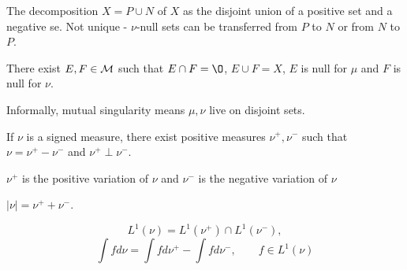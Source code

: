 \begin{dfn}
The decomposition $X = P \cup N$ of $X$ as the disjoint union of a positive set and a negative se. Not unique - $\nu$-null sets can be transferred from $P$ to $N$ or from $N$ to $P$.
\end{dfn}

\begin{dfn}
	There exist $E, F \in {\mathcal M}$ such that $E \cap F = \O $, $E \cup F = X$, $E$ is null for $\mu$ and $F$ is null for $\nu$.
\end{dfn}

\begin{rmk}
Informally, mutual singularity means $\mu, \nu$ live on disjoint sets.
\end{rmk}

\begin{thm}
	If $\nu$ is a signed measure, there exist positive measures $\nu^+, \nu^-$ such that $\nu = \nu^+ - \nu^-$ and $\nu^+ \perp \nu^-$.
\end{thm}

\begin{dfn}[$\nu^+, \nu^-$]
	$\nu^+$ is the positive variation of $\nu$ and $\nu^-$ is the negative variation of $\nu$
\end{dfn}

\begin{dfn}
	$|\nu| = \nu^+ + \nu^-$.
\end{dfn}
\begin{dfn}
	\[
	L^1(\nu) = L^1(\nu^+) \cap L^1( \nu^-),
	\]
	\[
	\int f d \nu = \int f d \nu^+ - \int f d \nu^-, \qquad f \in L^1(\nu) 
	\]
\end{dfn}











